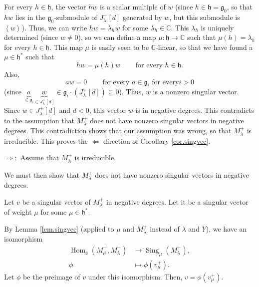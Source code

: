 \documentclass
[numbers=enddot,12pt,final,onecolumn,german,notitlepage]{scrartcl}%
\theoremstyle{definition}
\begin{document}
For every $h\in\mathfrak{h}$, the vector $hw$ is a scalar multiple of $w$
(since $h\in\mathfrak{h}=\mathfrak{g}_{0}$, so that $hw$ lies in the
$\mathfrak{g}_{0}$-submodule of $J_{\lambda}^{+}\left[  d\right]  $ generated
by $w$, but this submodule is $\left\langle w\right\rangle $). Thus, we can
write $hw=\lambda_{h}w$ for some $\lambda_{h}\in\mathbb{C}$. This $\lambda
_{h}$ is uniquely determined (since $w\neq0$), so we can define a map
$\mu:\mathfrak{h}\rightarrow\mathbb{C}$ such that $\mu\left(  h\right)
=\lambda_{h}$ for every $h\in\mathfrak{h}$. This map $\mu$ is easily seen to
be $\mathbb{C}$-linear, so that we have found a $\mu\in\mathfrak{h}^{\ast}$
such that%
\[
hw=\mu\left(  h\right)  w\ \ \ \ \ \ \ \ \ \ \text{for every }h\in
\mathfrak{h}.
\]
Also,%
\[
aw=0\ \ \ \ \ \ \ \ \ \ \text{for every }a\in\mathfrak{g}_{i}\text{ for every
}i>0
\]
(since $\underbrace{a}_{\in\mathfrak{g}_{i}}\underbrace{w}_{\in J_{\lambda
}^{+}\left[  d\right]  }\in\mathfrak{g}_{i}\cdot\left(  J_{\lambda}^{+}\left[
d\right]  \right)  \subseteq0$). Thus, $w$ is a nonzero singular vector. Since
$w\in J_{\lambda}^{+}\left[  d\right]  $ and $d<0$, this vector $w$ is in
negative degrees. This contradicts to the assumption that $M_{\lambda}^{+}$
does not have nonzero singular vectors in negative degrees. This contradiction
shows that our assumption was wrong, so that $M_{\lambda}^{+}$ is irreducible.
This proves the $\Longleftarrow$ direction of Corollary \ref{cor.singvec}.

$\Longrightarrow:$ Assume that $M_{\lambda}^{+}$ is irreducible.

We must then show that $M_{\lambda}^{+}$ does not have nonzero singular
vectors in negative degrees.

Let $v$ be a singular vector of $M_{\lambda}^{+}$ in negative degrees. Let it
be a singular vector of weight $\mu$ for some $\mu\in\mathfrak{h}^{\ast}$.

By Lemma \ref{lem.singvec} (applied to $\mu$ and $M_{\lambda}^{+}$ instead of
$\lambda$ and $Y$), we have an isomorphism%
\begin{align*}
\operatorname*{Hom}\nolimits_{\mathfrak{g}}\left(  M_{\mu}^{+},M_{\lambda}%
^{+}\right)   &  \rightarrow\operatorname*{Sing}\nolimits_{\mu}\left(
M_{\lambda}^{+}\right)  ,\\
\phi &  \mapsto\phi\left(  v_{\mu}^{+}\right)  .
\end{align*}
Let $\phi$ be the preimage of $v$ under this isomorphism. Then, $v=\phi\left(
v_{\mu}^{+}\right)  $.
\end{document}
